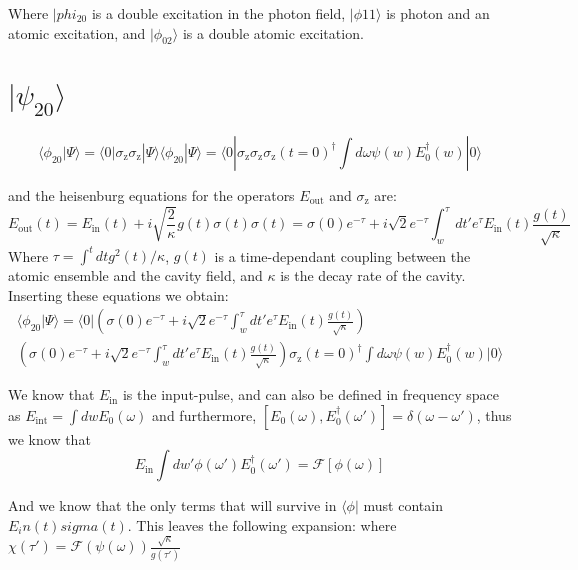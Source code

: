 \documentclass[12pt]{article}
\begin{document}
Where $| phi_{20}$ is a double excitation in the photon field, $| \phi{11} \rangle $ is photon and an atomic excitation, and $ | \phi_{02} \rangle $ is a double atomic excitation. 

\section{ $| \psi_{20} \rangle$}

\begin{equation}
\langle \phi_{20}| \Psi \rangle =\langle 0 | \sigma_\textrm{z} \sigma_\textrm{z} | \Psi \rangle
\langle \phi_{20}| \Psi \rangle =\langle 0 | \sigma_\textrm{z} \sigma_\textrm{z} 
\sigma_\textrm{z}(t=0)^\dagger \int d\omega \psi(w) E_0^\dagger(w) | 0 \rangle
\end{equation}

and the heisenburg equations for the operators $E_\textrm{out}$ and $\sigma_\textrm{z}$ are:
\begin{equation}
E_\textrm{out}(t) = E_\textrm{in}(t) + i \sqrt{\frac{2}{\kappa}} g(t) \sigma(t)
\sigma(t) = \sigma(0) e^{-\tau} + i\sqrt{2} e^{-\tau} \int^\tau_w d t' e^\tau E_\textrm{in}(t) \frac{g(t)}{\sqrt{\kappa}}
\end{equation}
Where $\tau = \int^t dt g^2(t)/\kappa$, $g(t)$ is a time-dependant coupling between the atomic ensemble and the cavity field, and $\kappa$ is the decay rate of the cavity. Inserting these equations we obtain:
\begin{multline}
\langle \phi_{20}| \Psi \rangle =\langle 0 | \left (  \sigma(0) e^{-\tau} + i\sqrt{2} e^{-\tau} \int^\tau_w d t' e^\tau E_\textrm{in}(t) \frac{g(t)}{\sqrt{\kappa}} \right )\\ \left ( \sigma(0) e^{-\tau} + i\sqrt{2} e^{-\tau} \int^\tau_w d t' e^\tau E_\textrm{in}(t) \frac{g(t)}{\sqrt{\kappa}} \right ) \sigma_\textrm{z}(t=0)^\dagger \int d\omega \psi(w) E_0^\dagger(w) | 0 \rangle
\end{multline}

We know that $E_\textrm{in}$ is the input-pulse, and can also be defined in frequency space as $E_\textrm{int} = \int dw E_0(\omega) $ and furthermore, $[E_0(\omega), E_0^\dagger(\omega') ] = \delta(\omega-\omega')$, thus we know that 
\begin{equation}
E_\textrm{in} \int dw' \phi(\omega') E_0^\dagger(\omega') = \mathscr{F}[\phi(\omega)]
\end{equation}

And we know that the only terms that will survive in $\langle \phi |$ must contain $E_in(t) sigma(t)$. This leaves the following expansion:
where $\chi(\tau') = \mathscr{F}(\psi(\omega)) \frac{\sqrt{\kappa}}{g(\tau')}$
\end{document}
